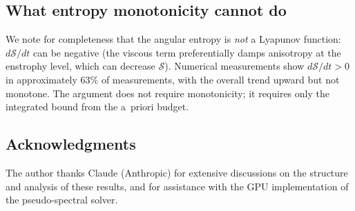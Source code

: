\documentclass[11pt]{article}
\theoremstyle{definition}
\newcommand{\cS}{\mathcal{S}}
\begin{document}
\subsection{What entropy monotonicity cannot do}

We note for completeness that the angular entropy is
\emph{not} a Lyapunov function: $d\cS/dt$ can be negative
(the viscous term preferentially damps anisotropy at the
enstrophy level, which can decrease $\cS$).  Numerical
measurements show $d\cS/dt > 0$ in approximately $63\%$
of measurements, with the overall trend upward but not
monotone.  The argument does not require monotonicity;
it requires only the integrated bound from the a~priori
budget.


\subsection*{Acknowledgments}

The author thanks Claude (Anthropic) for extensive
discussions on the structure and analysis of these results,
and for assistance with the GPU implementation of the
pseudo-spectral solver.
\end{document}
